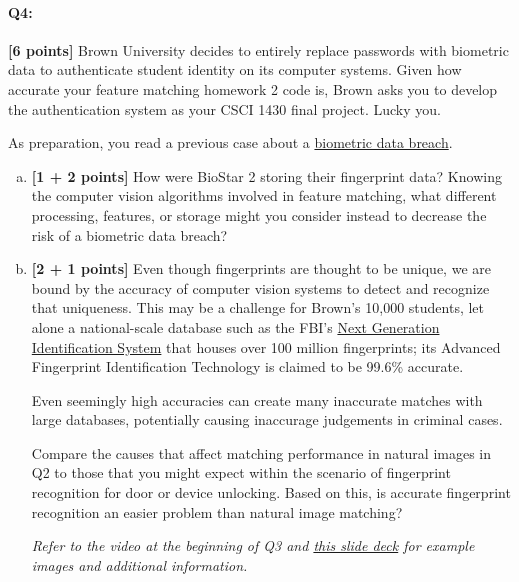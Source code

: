\pagebreak



\paragraph{Q4:} \textbf{[6 points]} Brown University decides to entirely replace passwords with biometric data to authenticate student identity on its computer systems. Given how accurate your feature matching homework 2 code is, Brown asks you to develop the authentication system as your CSCI 1430 final project. Lucky you.

As preparation, you read a previous case about a \href{https://www.vpnmentor.com/blog/report-biostar2-leak/}{biometric data breach}.

\begin{enumerate}[(a)]
    \item 
    \textbf{[1 + 2 points]}
How were BioStar 2 storing their fingerprint data? Knowing the computer vision algorithms involved in feature matching, what different processing, features, or storage might you consider instead to decrease the risk of a biometric data breach?

    \item 
    \textbf{[2 + 1 points]}
Even though fingerprints are thought to be unique, we are bound by the accuracy of computer vision systems to detect and recognize that uniqueness.
This may be a challenge for Brown's 10,000 students, let alone a national-scale database such as the FBI's \href{https://www.fbi.gov/services/cjis/fingerprints-and-other-biometrics/ngi}{Next Generation Identification System} that houses over 100 million fingerprints; its Advanced Fingerprint Identification Technology is claimed to be 99.6\% accurate.

Even seemingly high accuracies can create many inaccurate matches with large databases, potentially causing inaccurage judgements in criminal cases. 

Compare the causes that affect matching performance in natural images in Q2 to those that you might expect within the scenario of fingerprint recognition for door or device unlocking. Based on this, is accurate fingerprint recognition an easier problem than natural image matching?

\emph{Refer to the video at the beginning of Q3 and \href{http://biometrics.cse.msu.edu/Presentations/AnilJain_UniquenessOfFingerprints_NAS05.pdf}{this slide deck} for example images and additional information.}
\end{enumerate}

